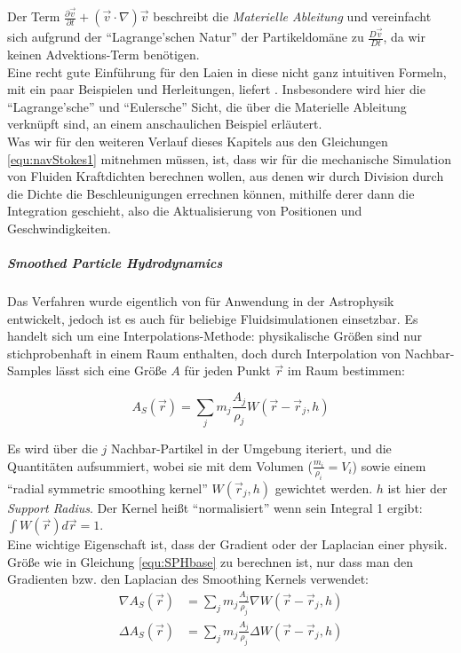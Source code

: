 		Der Term 			
		$
				\frac{\partial \vec{v}}{\partial t} 
				+ 
				\left( \vec{v} \cdot \nabla	\right) \vec{v} 
		$
		beschreibt die \emph{Materielle Ableitung} und vereinfacht sich aufgrund der "`Lagrange'schen Natur"'
		der Partikeldomäne zu $\frac{D \vec{v}}{D t}$, da wir keinen Advektions-Term benötigen.\\

		
			
		Eine recht gute Einführung für den Laien in diese nicht ganz intuitiven Formeln, mit ein paar Beispielen
		und Herleitungen, liefert \cite{Steil2007}. Insbesondere wird hier die  
		"`Lagrange'sche"' und "`Eulersche"' Sicht, die über die Materielle Ableitung verknüpft sind,
		an einem anschaulichen Beispiel erläutert.\\
		
		Was wir für den weiteren Verlauf dieses Kapitels aus den Gleichungen \ref{equ:navStokes1} mitnehmen müssen,
		ist, dass wir für die mechanische Simulation von Fluiden Kraftdichten berechnen wollen,
		aus denen wir durch Division durch die Dichte die Beschleunigungen errechnen können,
		mithilfe derer dann die Integration geschieht, also die Aktualisierung von Positionen und Geschwindigkeiten.
			
		
			
				
		\subparagraph{Smoothed Particle Hydrodynamics}
		Das Verfahren wurde eigentlich von \cite{Gingold_Monaghan_1977} für Anwendung in der Astrophysik
		entwickelt, jedoch ist es auch für beliebige Fluidsimulationen einsetzbar.
		Es handelt sich um eine Interpolations-Methode: physikalische Größen sind nur stichprobenhaft
		in einem Raum enthalten, doch durch Interpolation von Nachbar-Samples lässt sich eine Größe $A$
		für jeden Punkt $\vec{r}$ im Raum bestimmen:
		
		\begin{equation} \label{equ:SPHbase}
			A_S(\vec{r}) = \sum_j m_j \frac{A_j}{\rho_j} W(\vec{r}-\vec{r}_j,h)
		\end{equation}
		
		Es wird über die $j$ Nachbar-Partikel in der Umgebung iteriert, und die Quantitäten aufsummiert,
		wobei sie mit dem Volumen ($\frac{m_i}{\rho_i}=V_i$) 
		sowie einem "`radial symmetric smoothing kernel"'  $W(\vec{r}_j,h)$ gewichtet werden.
		$h$ ist hier der \emph{Support Radius}. Der Kernel heißt "`normalisiert"' wenn sein Integral 1 ergibt:
		$\int W(\vec{r}) d \vec{r}=1$.\\
		
		
		Eine wichtige Eigenschaft ist, dass der Gradient oder der Laplacian
		einer physik. Größe wie in Gleichung \ref{equ:SPHbase} zu berechnen ist, 
		nur dass man den Gradienten bzw. den Laplacian
		des Smoothing Kernels verwendet:
		\begin{subequations}\label{equ:navStokes1}
			\begin{align}
			\nabla A_S(\vec{r}) &= \sum_j m_j \frac{A_j}{\rho_j} \nabla W(\vec{r}-\vec{r}_j,h) \\
			\Delta A_S(\vec{r}) &= \sum_j m_j \frac{A_j}{\rho_j} \Delta W(\vec{r}-\vec{r}_j,h)
			\end{align}	
		\end{subequations}
		
